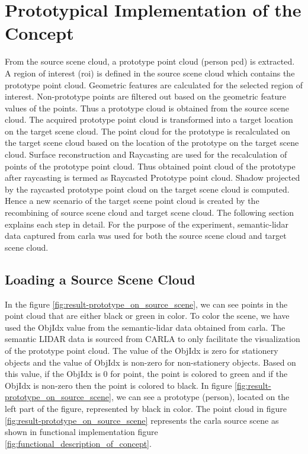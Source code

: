 \chapter{Prototypical Implementation of the Concept}
From the source scene cloud, a prototype point cloud (person \acrshort{pcd}) is extracted. A region of interest (\acrshort{roi}) is defined in the source scene cloud which contains the prototype point cloud. Geometric features are calculated for the selected region of interest. Non-prototype points are filtered out based on the geometric feature values of the points. Thus a prototype cloud is obtained from the source scene cloud. The acquired prototype point cloud is transformed into a target location on the target scene cloud. The point cloud for the prototype is recalculated on the target scene cloud based on the location of the prototype on the target scene cloud. Surface reconstruction and Raycasting are used for the recalculation of points of the prototype point cloud. Thus obtained point cloud of the prototype after raycasting is termed as Raycasted Prototype point cloud. Shadow projected by the raycasted prototype point cloud on the target scene cloud is computed. Hence a new scenario of the target scene point cloud is created by the recombining of source scene cloud and target scene cloud. The following section explains each step in detail. 
For the purpose of the experiment, semantic-lidar data captured from \acrshort{carla} was used for both the source scene cloud and target scene cloud.

\section{Loading a Source Scene Cloud}
 In the figure \ref{fig:result-prototype_on_source_scene}, we can see points in the point cloud that are either black or green in color. To color the scene, we have used the ObjIdx value from the semantic-lidar data obtained from \acrshort{carla}. The semantic LIDAR data is sourced from CARLA to only facilitate the visualization of the prototype point cloud. The value of the ObjIdx is zero for stationery objects and the value of ObjIdx is non-zero for non-stationery objects. Based on this value, if the ObjIdx is 0 for point, the point is colored to green and if the ObjIdx is non-zero then the point is colored to black. In figure \ref{fig:result-prototype_on_source_scene}, we can see a prototype (person), located on the left part of the figure, represented by black in color. The point cloud in figure \ref{fig:result-prototype_on_source_scene} represents the \acrshort{carla} source scene as shown in functional implementation figure \ref{fig:functional_description_of_concept}.

